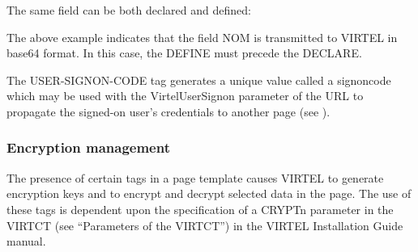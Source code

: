 \documentclass[letterpaper,10pt,english]{sphinxmanual}
\begin{document}
The same field can be both declared and defined:

\begin{sphinxVerbatim}[commandchars=\\\{\}]
   
   
\end{sphinxVerbatim}

The above example indicates that the field NOM is transmitted to VIRTEL in base64 format. In this case, the DEFINE must precede the DECLARE.
\label{\detokenize{User_Guide:v457ug-user-signon-code}}

\begin{sphinxVerbatim}[commandchars=\\\{\}]
\end{sphinxVerbatim}

The USER-SIGNON-CODE tag generates a unique value called a signoncode which may be used with the VirtelUserSignon parameter of the URL to propagate the signed-on user’s credentials to another page (see {\hyperref[\detokenize{User_Guide:v457ug-signon-propagation}]{}}).


\subsubsection{Encryption management}
\label{\detokenize{User_Guide:encryption-management}}

The presence of certain tags in a page template causes VIRTEL to generate encryption keys and to encrypt and decrypt selected data in the page. The use of these tags is dependent upon the specification of a CRYPTn parameter in the VIRTCT (see “Parameters of the VIRTCT”) in the VIRTEL Installation Guide manual.
\end{document}
